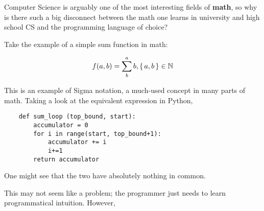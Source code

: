 \documentclass[../main.tex]{subfiles}
\begin{document}
Computer Science is arguably one of the most interesting fields of \textbf{math}, so why is there such a big disconnect between the math one learns in university and high school CS and the programming language of choice?

Take the example of a simple sum function in math:

\[ f(a, b) = \sum^a_{b} b , \set{a,b} \in \mathbb{N}  \]

This is an example of Sigma notation, a much-used concept in many parts of math. Taking a look at the equivalent expression in Python,

\begin{verbatim}
    def sum_loop (top_bound, start):
        accumulator = 0
        for i in range(start, top_bound+1):
            accumulator += i
            i+=1
        return accumulator
\end{verbatim}

One might see that the two have absolutely nothing in common.

This may not seem like a problem; the programmer just needs to learn programmatical intuition. However, 
\end{document}
